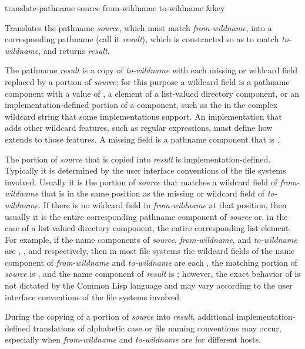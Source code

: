 \begin{defun}[Function]
translate-pathname source from-wildname to-wildname &key

    Translates the pathname \emph{source}, which must match \emph{from-wildname}, into
    a corresponding pathname (call it \emph{result}), which is constructed
    so as to match \emph{to-wildname}, and returns \emph{result}.

    The pathname \emph{result} is a copy of
    \emph{to-wildname} with each missing or wildcard
    field replaced by a portion of \emph{source}; for this purpose a wildcard field is a
    pathname component with a value of , a  element of a
    list-valued directory component, or an implementation-defined portion
    of a component, such as the \cdf{*} in the complex wildcard string
     that some implementations support.  An implementation that
    adds other wildcard features, such as regular expressions, must define
    how  extends to those features.  A missing field is
    a pathname component that is .

    The portion of \emph{source} that is copied into \emph{result} is
    implementation-defined.  Typically it is determined by the user interface conventions
    of the file systems involved.  Usually it is the portion of \emph{source}
    that matches a wildcard field of \emph{from-wildname} that is in the same
    position as the missing or wildcard field of \emph{to-wildname}.  If there
    is no wildcard field in \emph{from-wildname} at that position, then usually
    it is the entire corresponding pathname component of \emph{source} or, in
    the case of a list-valued directory component, the entire corresponding
    list element.  For example, if the name components of \emph{source},
    \emph{from-wildname}, and \emph{to-wildname} are , , and 
    respectively, then in most file systems the wildcard fields of the
    name component of \emph{from-wildname} and \emph{to-wildname} are each , the
    matching portion of \emph{source} is , and the name component of
    \emph{result} is ; however, the exact behavior of 
    is not dictated by the Common Lisp language and may
    vary according to the user interface conventions of the file systems
    involved.

    During the copying of a portion of \emph{source} into \emph{result}, additional
    implementation-defined translations of alphabetic case or file naming
    conventions may occur, especially when \emph{from-wildname} and
    \emph{to-wildname} are for different hosts.


\end{defun}
